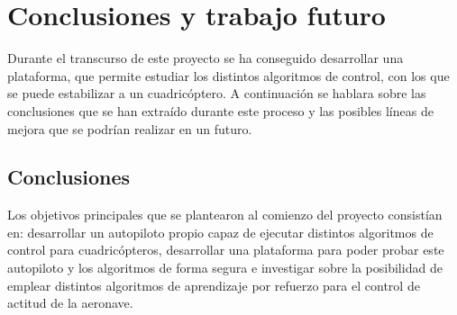 \chapter{Conclusiones y trabajo futuro}

Durante el transcurso de este proyecto se ha conseguido desarrollar una plataforma, que permite estudiar los distintos algoritmos de control, con los que se puede estabilizar a un cuadricóptero. A continuación se hablara sobre las conclusiones que se han extraído durante este proceso y las posibles líneas de mejora que se podrían realizar en un futuro.

\section{Conclusiones}

Los objetivos principales que se plantearon al comienzo del proyecto consistían en: desarrollar un autopiloto propio capaz de ejecutar distintos algoritmos de control para cuadricópteros, desarrollar una plataforma para poder probar este autopiloto y los algoritmos de forma segura e investigar sobre la posibilidad de emplear distintos algoritmos de aprendizaje por refuerzo para el control de actitud de la aeronave.







